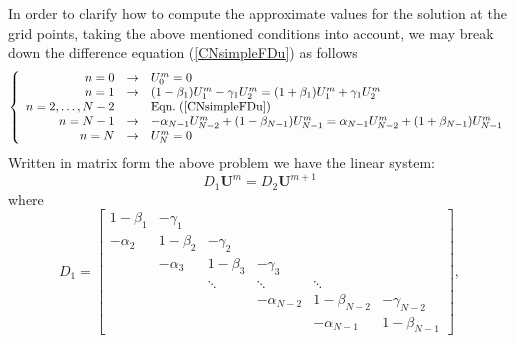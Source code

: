 In order to clarify how to compute the approximate values for the
solution at the grid points, taking the above mentioned conditions
into account, we may break down the difference equation
(\ref{CNsimpleFDu}) as follows
\begin{equation}
\left\{
\begin{array}{rcl}
n = 0 & \to & U^m_0  =  0 \\
n = 1 & \to & (1-\beta_1 ) U^m_1 - \gamma_1 U^m_2  =  (1+\beta_1 ) U^m_1+\gamma_1 U^m_2 \\
n = 2, \dots, N-2 & &  \textrm{Eqn.}\; (\ref{CNsimpleFDu})  \\
n = N-1 & \to & -\alpha_{N-1} U^m_{N-2} + (1-\beta_{N-1} ) U^m_{N-1}  = 
\alpha_{N-1} U^m_{N-2} + (1+\beta_{N-1} ) U^m_{N-1} \\ 
n = N & \to & U^m_N = 0
\end{array}
\right.
\end{equation}
Written in matrix form the above problem we have the linear system:
\begin{equation}
\label{CNmatrix}
D_1 \boldsymbol{U}^m = D_2 \boldsymbol{U}^{m+1}
\end{equation}
where 
\begin{equation}
  \nonumber
D_1 =\left[\begin{array}{cccccc}
1-\beta_1 & -\gamma_1 &  &  &  & \\
-\alpha_2 & 1- \beta_2 & -\gamma_2 & & & \\
& -\alpha_3 & 1- \beta_3 & -\gamma_3 & & \\
& & \ddots & \ddots & \ddots & \\
& & & -\alpha_{N-2} & 1-\beta_{N-2} & -\gamma_{N-2} \\
& & & & -\alpha_{N-1} & 1- \beta_{N-1} 
\end{array}\right],
\end{equation}

